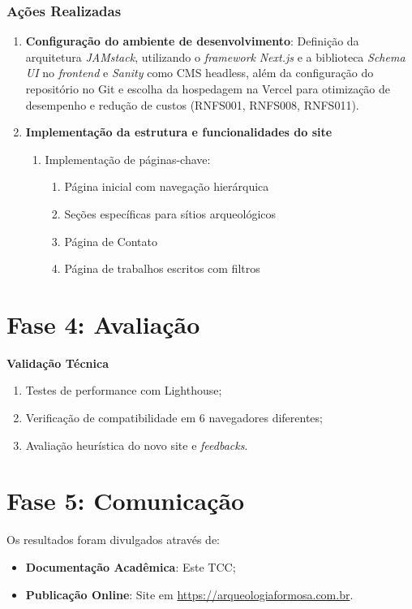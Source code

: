 \subsubsection*{Ações Realizadas}
\begin{enumerate}
\item \textbf{Configuração do ambiente de desenvolvimento}: Definição da arquitetura \textit{JAMstack}, utilizando o \textit{framework} \textit{Next.js} e a biblioteca \textit{Schema UI} no \textit{frontend} e \textit{Sanity} como CMS headless, além da configuração do repositório no Git e escolha da hospedagem na Vercel para otimização de desempenho e redução de custos (RNFS001, RNFS008, RNFS011).

    
    \item \textbf{Implementação da estrutura e funcionalidades do site}
    \begin{enumerate}
        \item Implementação de páginas-chave:
        \begin{enumerate}
            \item Página inicial com navegação hierárquica
            \item Seções específicas para sítios arqueológicos
            \item Página de Contato
            \item Página de trabalhos escritos com filtros
        \end{enumerate}
    \end{enumerate}
    
\end{enumerate}

\section{Fase 4: Avaliação} \label{sec:avaliacao-dsr}

    \textbf{Validação Técnica}
    \begin{enumerate}
        \item Testes de performance com Lighthouse;
        \item Verificação de compatibilidade em 6 navegadores diferentes;
        \item Avaliação heurística do novo site e \textit{feedbacks}.
    \end{enumerate}
    

\section{Fase 5: Comunicação} \label{sec:comunicacao-dsr}

Os resultados foram divulgados através de:
\begin{itemize}
    \item \textbf{Documentação Acadêmica}: Este TCC;
    \item \textbf{Publicação Online}: Site em \url{https://arqueologiaformosa.com.br}.
\end{itemize}



